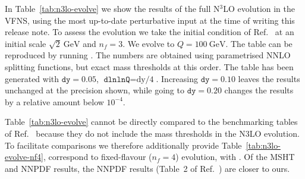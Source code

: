 In Table~\ref{tab:n3lo-evolve} we show the results of the full N$^3$LO
evolution in the VFNS, using the most up-to-date perturbative input at
the time of writing this release note. To assess the evolution we take
the initial condition of Ref.~\cite{Dittmar:2005ed} at an initial
scale $\sqrt{2}~\text{GeV}$ and $n_f=3$. We evolve to
$Q=100~\text{GeV}$. The table can be reproduced by running
. The
numbers are obtained using parametrised NNLO splitting functions, but
exact mass thresholds at this order.
%
The table has been generated with $\texttt{dy}=0.05$,
$\texttt{dlnlnQ}=\text{dy/4}$.
%
Increasing $\texttt{dy}=0.10$ leaves the results unchanged at the
precision shown, while going to $\texttt{dy}=0.20$ changes the results
by a relative amount below $10^{-4}$.

Table~\ref{tab:n3lo-evolve} cannot be directly compared to the
benchmarking tables of Ref.~\cite{Cooper-Sarkar:2024crx} because they
do not include the mass thresholds in the N3LO evolution.
%
To facilitate comparisons we therefore additionally provide
Table~\ref{tab:n3lo-evolve-nf4}, correspond to fixed-flavour ($n_f=4$)
evolution, with
.
%
Of the MSHT and NNPDF results, the NNPDF results (Table~2 of
Ref.~\cite{Cooper-Sarkar:2024crx}) are closer to ours.



